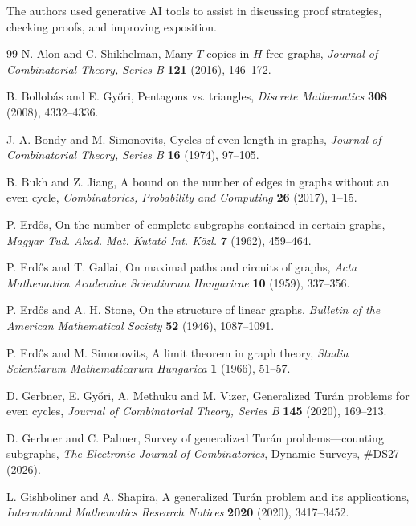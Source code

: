 \documentclass[11pt,letterpaper]{article}
\begin{document}
The authors used generative AI tools to assist in discussing proof strategies, checking proofs, and improving exposition.
\begin{thebibliography}{99}
N. Alon and C. Shikhelman,
Many $T$ copies in $H$-free graphs,
\emph{Journal of Combinatorial Theory, Series B} \textbf{121} (2016), 146--172.

B. Bollob\'as and E. Gy\H{o}ri,
Pentagons vs. triangles,
\emph{Discrete Mathematics} \textbf{308} (2008), 4332--4336.

J. A. Bondy and M. Simonovits,
Cycles of even length in graphs,
\emph{Journal of Combinatorial Theory, Series B} \textbf{16} (1974), 97--105.

B. Bukh and Z. Jiang,
A bound on the number of edges in graphs without an even cycle,
\emph{Combinatorics, Probability and Computing} \textbf{26} (2017), 1--15.

P. Erd\H{o}s,
On the number of complete subgraphs contained in certain graphs,
\emph{Magyar Tud. Akad. Mat. Kutat\'o Int. K\"ozl.} \textbf{7} (1962), 459--464.

P. Erd\H{o}s and T. Gallai,
 On maximal paths and circuits of graphs,
 \emph{Acta Mathematica Academiae Scientiarum Hungaricae} \textbf{10} (1959), 337--356.

P. Erd\H{o}s and A. H. Stone,
On the structure of linear graphs,
\emph{Bulletin of the American Mathematical Society} \textbf{52} (1946), 1087--1091.

P. Erd\H{o}s and M. Simonovits,
A limit theorem in graph theory,
\emph{Studia Scientiarum Mathematicarum Hungarica} \textbf{1} (1966), 51--57.

D. Gerbner, E. Gy\H{o}ri, A. Methuku and M. Vizer,
Generalized Tur\'an problems for even cycles,
\emph{Journal of Combinatorial Theory, Series B} \textbf{145} (2020), 169--213.

D. Gerbner and C. Palmer,
Survey of generalized Tur\'an problems---counting subgraphs,
\emph{The Electronic Journal of Combinatorics}, Dynamic Surveys, \#DS27 (2026).

L. Gishboliner and A. Shapira,
A generalized Tur\'an problem and its applications,
\emph{International Mathematics Research Notices} \textbf{2020} (2020), 3417--3452.


\end{thebibliography}
\end{document}
